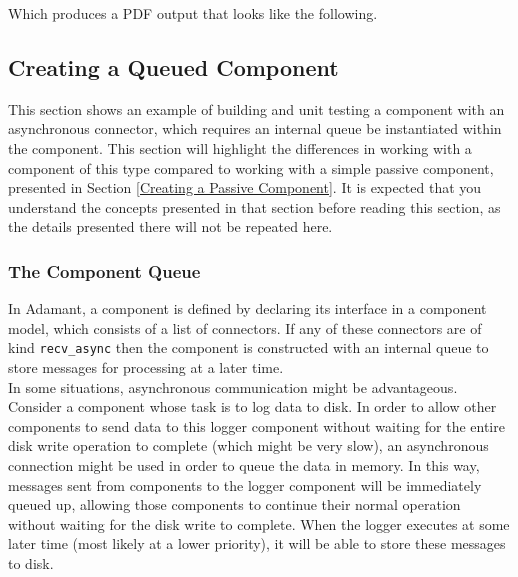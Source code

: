 Which produces a PDF output that looks like the following. \\

\noindent\makebox[\linewidth]{\rule{\textwidth}{0.4pt}}

\noindent\makebox[\linewidth]{\rule{\textwidth}{0.4pt}}

\subsection{Creating a Queued Component} \label{Creating a Queued Component}

This section shows an example of building and unit testing a component with an asynchronous connector, which requires an internal queue be instantiated within the component. This section will highlight the differences in working with a component of this type compared to working with a simple passive component, presented in Section \ref{Creating a Passive Component}. It is expected that you understand the concepts presented in that section before reading this section, as the details presented there will not be repeated here. \\


\subsubsection{The Component Queue} \label{The Component Queue}

In Adamant, a component is defined by declaring its interface in a component model, which consists of a list of connectors. If any of these connectors are of kind \texttt{recv\_async} then the component is constructed with an internal queue to store messages for processing at a later time.  \\

In some situations, asynchronous communication might be advantageous. Consider a component whose task is to log data to disk. In order to allow other components to send data to this logger component without waiting for the entire disk write operation to complete (which might be very slow), an asynchronous connection might be used in order to queue the data in memory. In this way, messages sent from components to the logger component will be immediately queued up, allowing those components to continue their normal operation without waiting for the disk write to complete. When the logger executes at some later time (most likely at a lower priority), it will be able to store these messages to disk. \\

